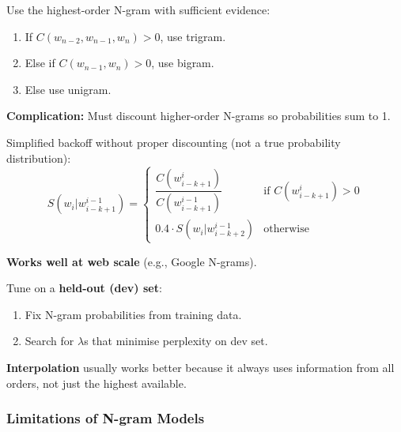 \begin{defbox}[Backoff]
Use the highest-order N-gram with sufficient evidence:
\begin{enumerate}
  \item If $C(w_{n-2}, w_{n-1}, w_n) > 0$, use trigram.
  \item Else if $C(w_{n-1}, w_n) > 0$, use bigram.
  \item Else use unigram.
\end{enumerate}

\textbf{Complication:} Must discount higher-order N-grams so probabilities sum to 1.
\end{defbox}

\begin{defbox}
Simplified backoff without proper discounting (not a true probability distribution):
\[
S(w_i | w_{i-k+1}^{i-1}) = 
\begin{cases}
\dfrac{C(w_{i-k+1}^i)}{C(w_{i-k+1}^{i-1})} & \text{if } C(w_{i-k+1}^i) > 0 \\[8pt]
0.4 \cdot S(w_i | w_{i-k+2}^{i-1}) & \text{otherwise}
\end{cases}
\]

\textbf{Works well at web scale} (e.g., Google N-grams).
\end{defbox}

\begin{tipbox}
Tune on a \textbf{held-out (dev) set}:
\begin{enumerate}
  \item Fix N-gram probabilities from training data.
  \item Search for $\lambda$s that minimise perplexity on dev set.
\end{enumerate}
\end{tipbox}

\begin{tipbox}
\textbf{Interpolation} usually works better because it always uses information from all orders, not just the highest available.
\end{tipbox}

\bigseparator

\subsubsection{Limitations of N-gram Models}

